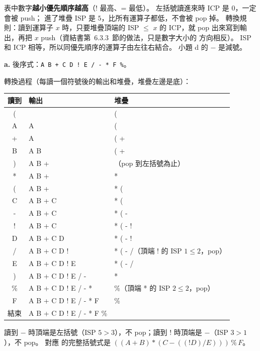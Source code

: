 \begin{pastsoln}
表中數字\textbf{越小優先順序越高}（! 最高、= 最低）。 左括號讀進來時 ICP 是 $0$，一定會被 push；
進了堆疊 ISP 是 $5$，比所有運算子都低，不會被 pop 掉。 轉換規則：讀到運算子 $x$ 時，只要堆疊頂端的
ISP $\le$ $x$ 的 ICP，就 pop 出來寫到輸出，再把 $x$ push（資結書第~6.3.3~節的做法，只是數字大小的
方向相反）。 ISP 和 ICP 相等，所以同優先順序的運算子由左往右結合。 小題 d 的 $-$ 是減號。

\textbf{a.} 後序式：\texttt{A B + C D ! E / - * F \%}。

轉換過程（每讀一個符號後的輸出和堆疊，堆疊左邊是底）：
\begin{center}
\small
\begin{tabular}{cll}
\toprule
讀到 & 輸出 & 堆疊 \\
\midrule
( & & ( \\
A & A & ( \\
+ & A & ( + \\
B & A B & ( + \\
) & A B + & （pop 到左括號為止） \\
* & A B + & * \\
( & A B + & * ( \\
C & A B + C & * ( \\
- & A B + C & * ( - \\
! & A B + C & * ( - ! \\
D & A B + C D & * ( - ! \\
/ & A B + C D ! & * ( - /（頂端 ! 的 ISP $1 \le 2$，pop） \\
E & A B + C D ! E & * ( - / \\
) & A B + C D ! E / - & * \\
\% & A B + C D ! E / - * & \%（頂端 * 的 ISP $2 \le 2$，pop） \\
F & A B + C D ! E / - * F & \% \\
結束 & A B + C D ! E / - * F \% & \\
\bottomrule
\end{tabular}
\end{center}
讀到 $-$ 時頂端是左括號（ISP $5 > 3$），不 pop；讀到 $!$ 時頂端是 $-$（ISP $3 > 1$），不 pop。 對應
的完整括號式是 $((A + B) * (C - ((!D) / E))) \,\%\, F$。


\end{pastsoln}

